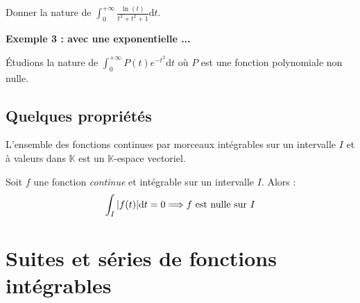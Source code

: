 \documentclass[french,11pt,twoside]{VcCours}
\newcommand{\dt}{\text{d}t}
\begin{document}
\begin{ApplicationDirecte}{} Donner la nature de $\int_{0}^{+ \infty} \frac{\ln(t)}{t^3+t^2+1} \dt$.
\end{ApplicationDirecte}

%
%
%
%
%
%
%
%
%

\textbf{Exemple 3 : avec une exponentielle ...}

Étudions la nature de $\int_{0}^{+ \infty} P(t) e^{-t^2} \dt$ où $P$ est une fonction polynomiale non nulle.

\vspace{6cm}


%

\subsection{Quelques propriétés}

\begin{Theoreme}{} L'ensemble des fonctions continues par morceaux intégrables 
	sur un intervalle $I$ et à valeurs dans $\mathbb{K}$ est un $\mathbb{K}$-espace vectoriel.
\end{Theoreme}

\begin{Proposition}{} Soit $f$ une fonction \emph{continue} et intégrable sur un intervalle $I$. Alors :
$$ \int_{I} \vert f(t) \vert \dt=0 \Longrightarrow f \hbox{ est nulle sur } I $$
\end{Proposition}

\section{Suites et séries de fonctions intégrables}
\end{document}
